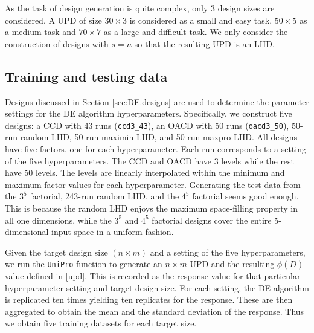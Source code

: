 \documentclass [PhD] {package/uclathes}
\begin{document}
As the task of design generation is quite complex, only 3 design sizes are considered.  A UPD of size $30\times3$ is considered as a small and easy task, $50\times5$ as a medium task and $70\times 7$ as a large and difficult task. We only consider the construction of designs with $s=n$ so that the resulting UPD is an LHD.

\subsection*{Training and testing data}

Designs discussed in Section \ref{sec:DE.designs} are used to determine the parameter settings for the DE algorithm hyperparameters. Specifically, we construct five designs: a CCD with 43 runs (\verb|ccd3_43|), an OACD with 50 runs (\verb|oacd3_50|), 50-run random LHD, 50-run maximin LHD, and 50-run maxpro LHD. All designs have five factors, one for each hyperparameter. Each run corresponds to a setting of the five hyperparameters. The CCD and OACD have 3 levels while the rest have 50 levels. The levels are linearly interpolated within the minimum and maximum factor values for each hyperparameter. Generating the test data from the $3^5$ factorial, 243-run random LHD, and the  $4^5$ factorial seems good enough. This is because the random LHD enjoys the maximum space-filling property in all one dimensions, while the $3^5$ and $4^5$ factorial designs cover the entire 5-dimensional input space in a uniform fashion. %

Given the target design size $(n \times m)$ and a setting of the five hyperparameters, we run the \texttt{UniPro} function to generate an $n \times m$ UPD and the resulting $\phi(D)$ value defined in  \eqref{upd}. This is recorded as the response value for that particular hyperparameter setting and target design size. For each setting, the DE algorithm is replicated ten times yielding ten replicates for the response. These are then aggregated to obtain the mean and the standard deviation of the response.
Thus we obtain five training datasets for each target size.


\end{document}
